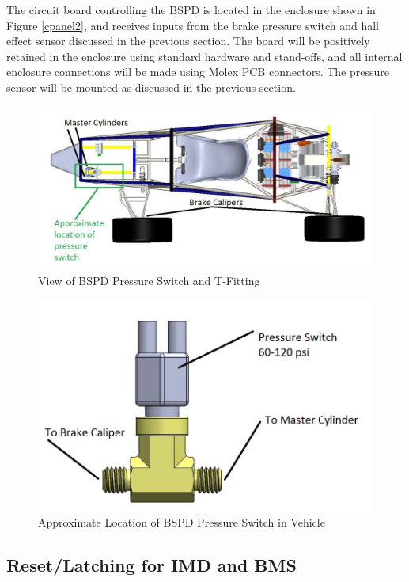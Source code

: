 \documentclass{article}
\begin{document}
            The circuit board controlling the BSPD is located in the enclosure shown in Figure \ref{cpanel2}, and receives inputs from the brake pressure switch and hall effect sensor discussed in the previous section. The board will be positively retained in the enclosure using standard hardware and stand-offs, and all internal enclosure connections will be made using Molex PCB connectors. The pressure sensor will be mounted as discussed in the previous section.

            \begin{figure}[H]
                \centering
                \includegraphics[width = 0.9 \textwidth]{brakeincar}
                \caption{View of BSPD Pressure Switch and T-Fitting}
                \label{BSPDmech1}
            \end{figure}
            
            \begin{figure}[H]
                \centering
                \includegraphics[width = 0.9 \textwidth]{brakesensor}
                \caption{Approximate Location of BSPD Pressure Switch in Vehicle}
                \label{BSPDmech2}
            \end{figure}

    \subsection{Reset/Latching for IMD and BMS}
    
\end{document}
